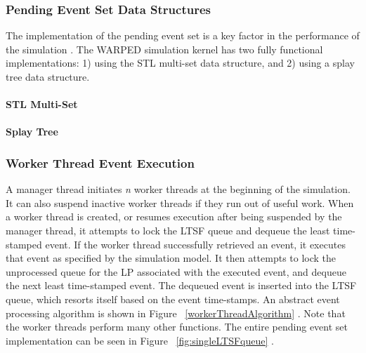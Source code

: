 \documentclass[a4paper]{article}
\begin{document}
\subsubsection{\textbf{Pending Event Set Data Structures}}

The implementation of the pending event set is a key factor in the performance
of the simulation \cite{twpes}.  The WARPED simulation kernel has two fully
functional implementations: 1) using the STL multi-set data structure, and 2)
using a splay tree data structure.

\setcounter{secnumdepth}{5}
\setcounter{tocdepth}{5}
\paragraph{\textbf{STL Multi-Set}}


\paragraph{\textbf{Splay Tree}}

\subsubsection{\textbf{Worker Thread Event Execution}}

A manager thread initiates \textit{n} worker threads at the beginning of the
simulation.  It can also suspend inactive worker threads if they run out of
useful work.  When a worker thread is created, or resumes execution after being
suspended by the manager thread, it attempts to lock the LTSF queue and dequeue
the least time-stamped event.  If the worker thread successfully retrieved an
event, it executes that event as specified by the simulation model.  It then
attempts to lock the unprocessed queue for the LP associated with the executed
event, and dequeue the next least time-stamped event.  The dequeued event is
inserted into the LTSF queue, which resorts itself based on the event
time-stamps.  An abstract event processing algorithm is shown in Figure
~\ref{workerThreadAlgorithm} \cite{dickman}.  Note that the worker threads
perform many other functions.  The entire pending event set implementation can
be seen in Figure ~\ref{fig:singleLTSFqueue} \cite{dickman}.
\end{document}

